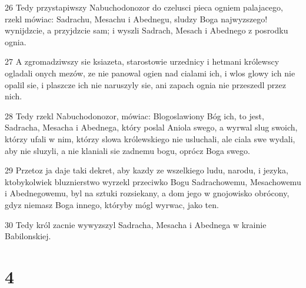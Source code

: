 \par 26 Tedy przystapiwszy Nabuchodonozor do czelusci pieca ogniem palajacego, rzekl mówiac: Sadrachu, Mesachu i Abednegu, sludzy Boga najwyzszego! wynijdzcie, a przyjdzcie sam; i wyszli Sadrach, Mesach i Abednego z posrodku ognia.
\par 27 A zgromadziwszy sie ksiazeta, starostowie urzednicy i hetmani królewscy ogladali onych mezów, ze nie panowal ogien nad cialami ich, i wlos glowy ich nie opalil sie, i plaszcze ich nie naruszyly sie, ani zapach ognia nie przeszedl przez nich.
\par 28 Tedy rzekl Nabuchodonozor, mówiac: Blogoslawiony Bóg ich, to jest, Sadracha, Mesacha i Abednega, który poslal Aniola swego, a wyrwal slug swoich, którzy ufali w nim, którzy slowa królewskiego nie usluchali, ale ciala swe wydali, aby nie sluzyli, a nie klaniali sie zadnemu bogu, oprócz Boga swego.
\par 29 Przetoz ja daje taki dekret, aby kazdy ze wszelkiego ludu, narodu, i jezyka, ktobykolwiek bluznierstwo wyrzekl przeciwko Bogu Sadrachowemu, Mesachowemu i Abednegowemu, byl na sztuki rozsiekany, a dom jego w gnojowisko obrócony, gdyz niemasz Boga innego, któryby mógl wyrwac, jako ten.
\par 30 Tedy król zacnie wywyzszyl Sadracha, Mesacha i Abednega w krainie Babilonskiej.

\chapter{4}

